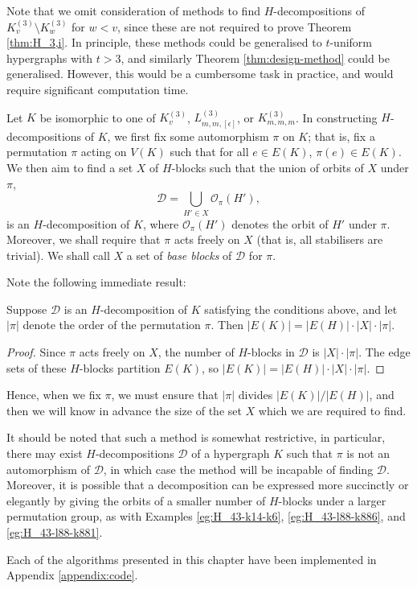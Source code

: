 Note that we omit consideration of methods to find $H$-decompositions of $K_{v}^{(3)} \setminus K_{w}^{(3)}$ for $w < v$, since these are not required to prove Theorem \ref{thm:H_3,i}.
In principle, these methods could be generalised to $t$-uniform hypergraphs with $t > 3$, and similarly Theorem \ref{thm:design-method} could be generalised. However, this would be a cumbersome task in practice, and would require significant computation time.

Let $K$ be isomorphic to one of $K_{v}^{(3)}$, $L_{m,m,[\epsilon]}^{(3)}$, or $K_{m,m,m}^{(3)}$.
In constructing $H$-decompositions of $K$, we first fix some automorphism $\pi$ on $K$; that is, fix a permutation $\pi$ acting on $V(K)$ such that for all $e \in E(K)$, $\pi(e) \in E(K)$. We then aim to find a set $X$ of $H$-blocks such that the union of orbits of $X$ under $\pi$,
\begin{equation} \label{eq:decomposition-orbit}
    \mathcal{D} = \bigcup_{H' \in X} \mathcal{O}_\pi(H'),
\end{equation}
is an $H$-decomposition of $K$, where $\mathcal{O}_\pi(H')$ denotes the orbit of $H'$ under $\pi$. Moreover, we shall require that $\pi$ acts freely on $X$ (that is, all stabilisers are trivial).
We shall call $X$ a set of {\em base blocks} of $\mathcal{D}$ for $\mathcal{\pi}$.

Note the following immediate result:

\begin{lemma} \label{lem:orbit-divisibility}
Suppose $\mathcal{D}$ is an $H$-decomposition of $K$ satisfying the conditions above, and let $|\pi|$ denote the order of the permutation $\pi$.
Then $|E(K)| = |E(H)| \cdot |X| \cdot |\pi|$.
\end{lemma}

\begin{proof}
Since $\pi$ acts freely on $X$, the number of $H$-blocks in $\mathcal{D}$ is $|X| \cdot |\pi|$. The edge sets of these $H$-blocks partition $E(K)$, so $|E(K)| = |E(H)| \cdot |X| \cdot |\pi|$.
\end{proof}

Hence, when we fix $\pi$, we must ensure that $|\pi|$ divides $|E(K)|/|E(H)|$, and then we will know in advance the size of the set $X$ which we are required to find.

It should be noted that such a method is somewhat restrictive, in particular, there may exist $H$-decompositions $\mathcal{D}$ of a hypergraph $K$ such that $\pi$ is not an automorphism of $\mathcal{D}$, in which case the method will be incapable of finding $\mathcal{D}$.
Moreover, it is possible that a decomposition can be expressed more succinctly or elegantly by giving the orbits of a smaller number of $H$-blocks under a larger permutation group, as with Examples \ref{eg:H_43-k14-k6}, \ref{eg:H_43-l88-k886}, and \ref{eg:H_43-l88-k881}.

Each of the algorithms presented in this chapter have been implemented in Appendix \ref{appendix:code}.
